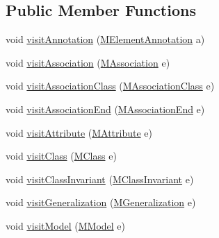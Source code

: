\subsection*{Public Member Functions}
\begin{DoxyCompactItemize}
\item 
void \hyperlink{interfaceorg_1_1tzi_1_1use_1_1uml_1_1mm_1_1_m_m_visitor_adc07767a55b879a40775646efbbb11cb}{visit\-Annotation} (\hyperlink{classorg_1_1tzi_1_1use_1_1uml_1_1mm_1_1_m_element_annotation}{M\-Element\-Annotation} a)
\item 
void \hyperlink{interfaceorg_1_1tzi_1_1use_1_1uml_1_1mm_1_1_m_m_visitor_ae1ccfa81b24a777999acda3501719efe}{visit\-Association} (\hyperlink{interfaceorg_1_1tzi_1_1use_1_1uml_1_1mm_1_1_m_association}{M\-Association} e)
\item 
void \hyperlink{interfaceorg_1_1tzi_1_1use_1_1uml_1_1mm_1_1_m_m_visitor_ae1708e3c60f1e2cfe9679dd752fa7076}{visit\-Association\-Class} (\hyperlink{interfaceorg_1_1tzi_1_1use_1_1uml_1_1mm_1_1_m_association_class}{M\-Association\-Class} e)
\item 
void \hyperlink{interfaceorg_1_1tzi_1_1use_1_1uml_1_1mm_1_1_m_m_visitor_acf7e0eae188e74dcadc7c25ae0c4961c}{visit\-Association\-End} (\hyperlink{classorg_1_1tzi_1_1use_1_1uml_1_1mm_1_1_m_association_end}{M\-Association\-End} e)
\item 
void \hyperlink{interfaceorg_1_1tzi_1_1use_1_1uml_1_1mm_1_1_m_m_visitor_afb5251f8d47d368ae16e4d408d68843f}{visit\-Attribute} (\hyperlink{classorg_1_1tzi_1_1use_1_1uml_1_1mm_1_1_m_attribute}{M\-Attribute} e)
\item 
void \hyperlink{interfaceorg_1_1tzi_1_1use_1_1uml_1_1mm_1_1_m_m_visitor_aa75db2aeb717cd9299b17af610d8b782}{visit\-Class} (\hyperlink{interfaceorg_1_1tzi_1_1use_1_1uml_1_1mm_1_1_m_class}{M\-Class} e)
\item 
void \hyperlink{interfaceorg_1_1tzi_1_1use_1_1uml_1_1mm_1_1_m_m_visitor_a089caa98ee27da4be6476606430cd335}{visit\-Class\-Invariant} (\hyperlink{classorg_1_1tzi_1_1use_1_1uml_1_1mm_1_1_m_class_invariant}{M\-Class\-Invariant} e)
\item 
void \hyperlink{interfaceorg_1_1tzi_1_1use_1_1uml_1_1mm_1_1_m_m_visitor_aef4c8d89c077885733e77ab4ca0e8ed5}{visit\-Generalization} (\hyperlink{classorg_1_1tzi_1_1use_1_1uml_1_1mm_1_1_m_generalization}{M\-Generalization} e)
\item 
void \hyperlink{interfaceorg_1_1tzi_1_1use_1_1uml_1_1mm_1_1_m_m_visitor_a3975c645c1f28fb6ff54f183d3a5de37}{visit\-Model} (\hyperlink{classorg_1_1tzi_1_1use_1_1uml_1_1mm_1_1_m_model}{M\-Model} e)

\end{DoxyCompactItemize}
